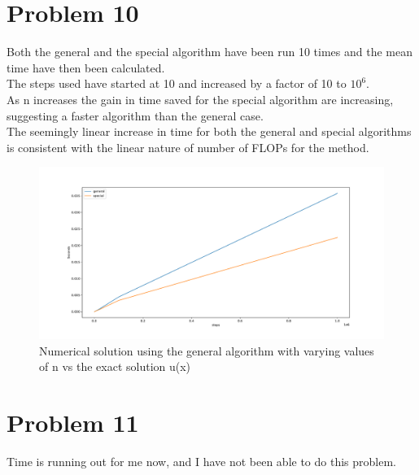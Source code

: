 \documentclass[english,notitlepage]{revtex4-1}  %
\begin{document}
\section{Problem 10}
Both the general and the special algorithm have been run 10 times and the mean time have then been calculated. \\
The steps used have started at 10 and increased by a factor of 10 to $10^6$. \\
As n increases the gain in time saved for the special algorithm are increasing, suggesting a faster algorithm than the general case. \\
The seemingly linear increase in time for both the general and special algorithms is consistent with the linear nature of number of FLOPs for the method.  
\begin{figure}[H]
	\centering
	\includegraphics[scale=0.5]{../Figures/problem10.pdf}
	\caption{Numerical solution using the general algorithm with varying values of n vs the exact solution u(x)}
\end{figure}

\section{Problem 11}
Time is running out for me now, and I have not been able to do this problem. 
\end{document}
